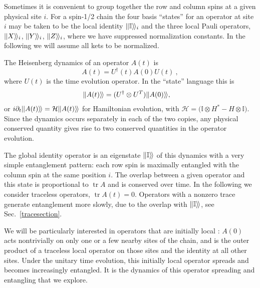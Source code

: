 \documentclass[aps,prx,twocolumn,superscriptaddress,floatfix,nofootinbib,prx]{revtex4}
\renewcommand{\>}{\right\rangle}
\newcommand{\<}{\left\langle}
\newcommand{\ba}{\begin{align}}
\newcommand{\tr}{\operatorname{tr}}
\newcommand{\opket}[1]{|\hspace{-0.15mm}| #1 \rangle\hspace{-0.5mm}\rangle}
\begin{document}
Sometimes it is convenient to group together the row and column spins at a given physical site $i$. For a spin-1/2 chain the four basis ``states'' for an operator at site $i$ may be taken to be the local identity $\opket{\mathbb{I}}_i$ and the three local Pauli operators, $\opket{X}_i$, $\opket{Y}_i$, $\opket{Z}_i$, where we have suppressed normalization constants. In the following we will assume all kets to be normalized.
 
The Heisenberg dynamics of an operator $A(t)$ is
\begin{equation}
    A(t)=U^{\dagger}(t)A(0)U(t) ~,
    \label{eq:operator}
\end{equation}
where $U(t)$ is the time evolution operator. In the ``state'' language this is
\ba
\opket{A(t)}& = (U^\dag\otimes U^T) \opket{A(0)},
\end{align} 
or ${i \partial_t \opket{A(t)}  =\mathcal{H} \opket{A(t)}}$  for Hamiltonian evolution, with ${\mathcal{H} =(\mathbb{I} \otimes H^*}-H\otimes \mathbb{I})$. Since the dynamics occurs separately in each of the two copies, any physical conserved quantity gives rise to two conserved quantities in the operator evolution.

The global identity operator is an eigenstate $\opket{\mathbb{I}}$ of this dynamics with a very simple entanglement pattern: each row spin is maximally entangled with the column spin at the same position $i$. The overlap between a given operator and this state is proportional to $\tr A$ and  is conserved over time. In the following  we consider traceless operators, $\tr A(t) =0$. Operators with a nonzero trace generate entanglement more slowly, due to the overlap with $\opket{\mathbb{I}}$, see Sec.~\ref{tracesection}.



 We will be particularly interested in operators that are initially local \cite{rss}: $A(0)$ acts nontrivially on only one or a few nearby sites of the chain, and is the outer product of a traceless local operator on those sites and the identity at all other sites.  Under the unitary time evolution, this initially local operator spreads and becomes increasingly entangled.  It is the dynamics of this operator spreading and entangling that we explore. 
\end{document}
